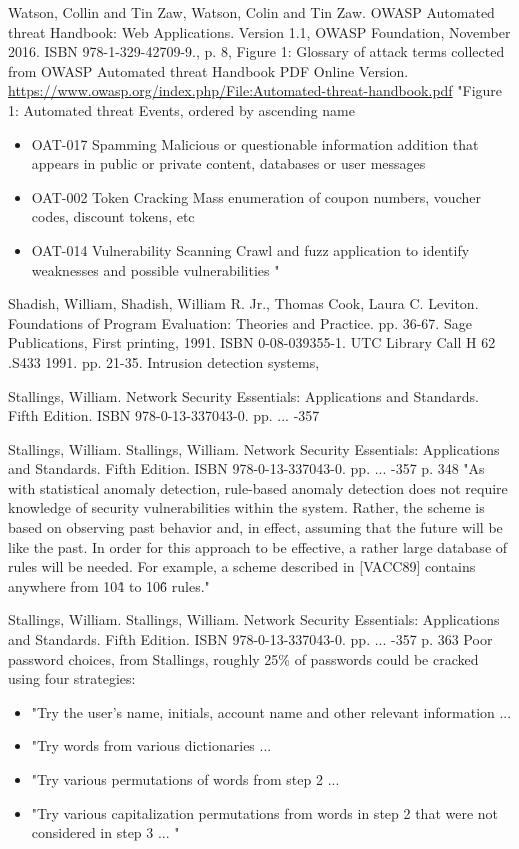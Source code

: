 Watson, Collin and Tin Zaw, Watson, Colin and Tin Zaw. OWASP Automated \gls{threat} Handbook: Web Applications. Version 1.1, OWASP Foundation, November 2016. ISBN 978-1-329-42709-9., p. 8, Figure 1: Glossary of \gls{attack} terms collected from OWASP Automated \gls{threat} Handbook PDF Online Version. \url{https://www.owasp.org/index.php/File:Automated-threat-handbook.pdf} "Figure 1: Automated \gls{threat} Events, ordered by ascending name \begin{itemize} \item OAT-017 Spamming Malicious or questionable information addition that appears in public or private content, databases or user messages \item OAT-002 Token Cracking Mass enumeration of coupon numbers, voucher codes, discount tokens, etc \item OAT-014 Vulnerability Scanning Crawl and fuzz application to identify weaknesses and possible vulnerabilities " \end{itemize}

Shadish, William, Shadish, William R. Jr., Thomas Cook, Laura C. Leviton. Foundations of Program Evaluation: Theories and Practice. pp. 36-67. Sage Publications, First printing, 1991. ISBN 0-08-039355-1. UTC Library Call H 62 .S433 1991. pp. 21-35. Intrusion detection systems,

Stallings, William. Network Security Essentials: Applications and Standards. Fifth Edition. ISBN 978-0-13-337043-0. pp. ... -357

Stallings, William. Stallings, William. Network Security Essentials: Applications and Standards. Fifth Edition. ISBN 978-0-13-337043-0. pp. ... -357 p. 348 "As with statistical anomaly detection, rule-based anomaly detection does not require knowledge of security vulnerabilities within the system. Rather, the scheme is based on observing past behavior and, in effect, assuming that the future will be like the past. In order for this approach to be effective, a rather large database of rules will be needed. For example, a scheme described in [VACC89] contains anywhere from 10\^4 to 10\^6 rules."

Stallings, William. Stallings, William. Network Security Essentials: Applications and Standards. Fifth Edition. ISBN 978-0-13-337043-0. pp. ... -357 p. 363 Poor \gls{password} choices, from Stallings, roughly 25\% of passwords could be cracked using four strategies: \begin{itemize} \item "Try the user's name, initials, account name and other relevant information ... \item "Try words from various dictionaries ... \item "Try various permutations of words from step 2 ... \item "Try various capitalization permutations from words in step 2 that were not considered in step 3 ... " \end{itemize}


